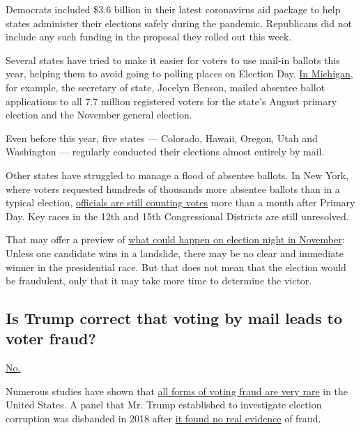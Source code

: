 Democrats included \$3.6 billion in their latest coronavirus aid package
to help states administer their elections safely during the pandemic.
Republicans did not include any such funding in the proposal they rolled
out this week.

Several states have tried to make it easier for voters to use mail-in
ballots this year, helping them to avoid going to polling places on
Election Day.
\href{https://www.nytimes3xbfgragh.onion/2020/05/20/us/politics/trump-mail-in-voting-absentee-ballots.html}{In
Michigan}, for example, the secretary of state, Jocelyn Benson, mailed
absentee ballot applications to all 7.7 million registered voters for
the state's August primary election and the November general election.

Even before this year, five states --- Colorado, Hawaii, Oregon, Utah
and Washington --- regularly conducted their elections almost entirely
by mail.

Other states have struggled to manage a flood of absentee ballots. In
New York, where voters requested hundreds of thousands more absentee
ballots than in a typical election,
\href{https://www.nytimes3xbfgragh.onion/2020/07/17/nyregion/election-absentee-ballots-primary.html}{officials
are still counting votes} more than a month after Primary Day. Key races
in the 12th and 15th Congressional Districts are still unresolved.

That may offer a preview of
\href{https://www.nytimes3xbfgragh.onion/2020/06/24/us/politics/november-2020-election-day-results.html}{what
could happen on election night in November}: Unless one candidate wins
in a landslide, there may be no clear and immediate winner in the
presidential race. But that does not mean that the election would be
fraudulent, only that it may take more time to determine the victor.

\hypertarget{is-trump-correct-that-voting-by-mail-leads-to-voter-fraud}{%
\subsection{Is Trump correct that voting by mail leads to voter
fraud?}\label{is-trump-correct-that-voting-by-mail-leads-to-voter-fraud}}

\href{https://www.nytimes3xbfgragh.onion/article/mail-in-voting-explained.html}{No.}

Numerous studies have shown that
\href{https://www.nytimes3xbfgragh.onion/article/mail-in-voting-explained.html}{all
forms of voting fraud are very rare} in the United States. A panel that
Mr. Trump established to investigate election corruption was disbanded
in 2018 after
\href{https://www.nytimes3xbfgragh.onion/2018/01/03/us/politics/trump-voter-fraud-commission.html}{it
found no real evidence} of fraud.

